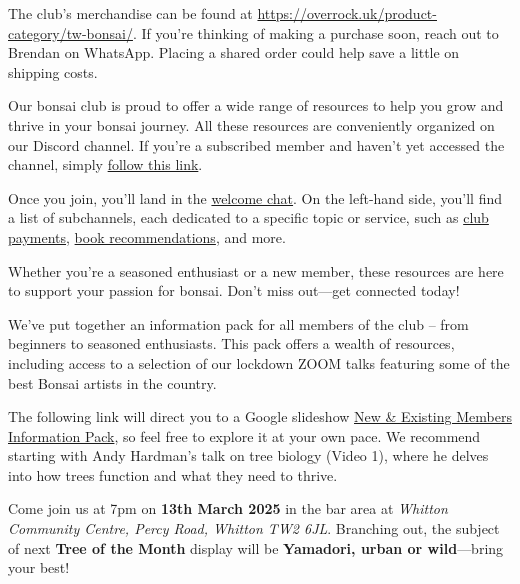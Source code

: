 \label{2025-03-news}

\noindent
The club's merchandise can be found at \url{https://overrock.uk/product-category/tw-bonsai/}. If you're thinking of making a purchase soon, reach out to Brendan on WhatsApp. Placing a shared order could help save a little on shipping costs.

\medskip
{}
\noindent  
Our bonsai club is proud to offer a wide range of resources to help you grow and thrive in your bonsai journey. All these resources are conveniently organized on our Discord channel. If you're a subscribed member and haven’t yet accessed the channel, simply \href{https://discord.gg/N6yka6XJ}{follow this link}.

Once you join, you'll land in the \href{https://discord.com/channels/873817545013071872/1118677826208550923}{welcome chat}. On the left\--hand side, you'll find a list of subchannels, each dedicated to a specific topic or service, such as \href{https://discord.com/channels/873817545013071872/1039691122148130876}{club payments}, \href{https://discord.com/channels/873817545013071872/1001189937409949698}{book recommendations}, and more. 

Whether you're a seasoned enthusiast or a new member, these resources are here to support your passion for bonsai. Don't miss out---get connected today!

\medskip	
{}
\noindent
We've put together an information pack for all members of the club – from beginners to seasoned enthusiasts. This pack offers a wealth of resources, including access to a selection of our lockdown ZOOM talks featuring some of the best Bonsai artists in the country.

The following link will direct you to a Google slideshow \href{https://docs.google.com/presentation/d/1L5SRA_ZSvnGMLbRt0CSf-Uz7BaiOfxOs7OUHMM_XrTY/edit?usp=sharing}{New \& Existing Members Information Pack}, so feel free to explore it at your own pace. We recommend starting with Andy Hardman’s talk on tree biology (Video 1), where he delves into how trees function and what they need to thrive.

\medskip
{}
\noindent
Come join us at 7pm on \textbf{13th March 2025} in the bar area at \emph{Whitton Community Centre, Percy Road, Whitton TW2 6JL}. Branching out, the subject of next \textbf{Tree of the Month} display will be \textbf{Yamadori, urban or wild}---bring your best!
	
